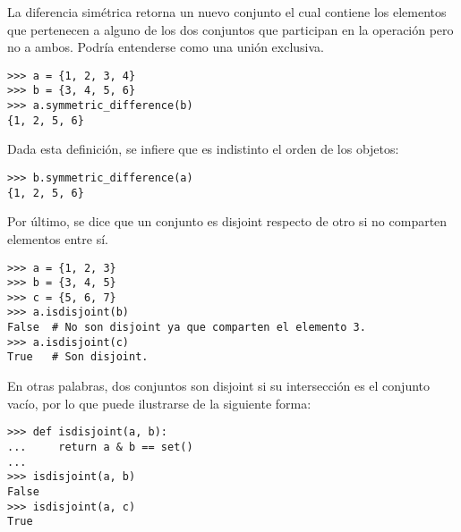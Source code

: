 La diferencia simétrica retorna un nuevo conjunto el cual contiene los elementos que pertenecen a alguno de los dos conjuntos que participan en la operación pero no a ambos. Podría entenderse como una unión exclusiva.

\begin{Verbatim}[frame=single]
>>> a = {1, 2, 3, 4}
>>> b = {3, 4, 5, 6}
>>> a.symmetric_difference(b)
{1, 2, 5, 6}
\end{Verbatim}

Dada esta definición, se infiere que es indistinto el orden de los objetos:

\begin{Verbatim}[frame=single]
>>> b.symmetric_difference(a)
{1, 2, 5, 6}
\end{Verbatim}

Por último, se dice que un conjunto es disjoint respecto de otro si no comparten elementos entre sí.

\begin{Verbatim}[frame=single]
>>> a = {1, 2, 3}
>>> b = {3, 4, 5}
>>> c = {5, 6, 7}
>>> a.isdisjoint(b)
False  # No son disjoint ya que comparten el elemento 3.
>>> a.isdisjoint(c)
True   # Son disjoint.
\end{Verbatim}

En otras palabras, dos conjuntos son disjoint si su intersección es el conjunto vacío, por lo que puede ilustrarse de la siguiente forma:

\begin{Verbatim}[frame=single]
>>> def isdisjoint(a, b):
...     return a & b == set()
...
>>> isdisjoint(a, b)
False
>>> isdisjoint(a, c)
True
\end{Verbatim}


